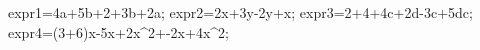 \documentclass[exercice]{thedocument}%
\begin{document}
%
    \>expr1=4a+5b+2+3b+2a;%
    \>expr2=2x+3y-2y+x;%
    \>expr3=2+4+4c+2d-3c+5dc;%
    \>expr4=(3+6)x-5x+2x^2+-2x+4x^2;%
\end{document}
